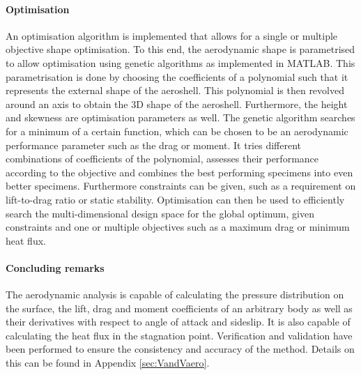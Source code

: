 \paragraph{Optimisation} \label{par:Optimisation}
An optimisation algorithm is implemented that allows for a single or multiple objective shape optimisation. To this end, the aerodynamic shape is parametrised to allow optimisation using genetic algorithms as implemented in MATLAB. This parametrisation is done by choosing the coefficients of a polynomial such that it represents the external shape of the aeroshell. This polynomial is then revolved around an axis to obtain the 3D shape of the aeroshell. Furthermore, the height and skewness are optimisation parameters as well. The genetic algorithm searches for a minimum of a certain function, which can be chosen to be an aerodynamic performance parameter such as the drag or moment. It tries different combinations of coefficients of the polynomial, assesses their performance according to the objective and combines the best performing specimens into even better specimens. Furthermore constraints can be given, such as a requirement on lift-to-drag ratio or static stability. Optimisation can then be used to efficiently search the multi-dimensional design space for the global optimum, given constraints and one or multiple objectives such as a maximum drag or minimum heat flux.

\paragraph{Concluding remarks}
The aerodynamic analysis is capable of calculating the pressure distribution on the surface, the lift, drag and moment coefficients of an arbitrary body as well as their derivatives with respect to angle of attack and sideslip. It is also capable of calculating the heat flux in the stagnation point. Verification and validation have been performed to ensure the consistency and accuracy of the method. Details on this can be found in Appendix \ref{sec:VandVaero}.